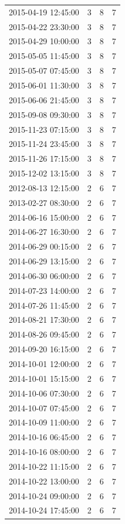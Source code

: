 \begin{tabular}{lrrr}
2015-04-19 12:45:00 & 3 & 8 & 7 \\
2015-04-22 23:30:00 & 3 & 8 & 7 \\
2015-04-29 10:00:00 & 3 & 8 & 7 \\
2015-05-05 11:45:00 & 3 & 8 & 7 \\
2015-05-07 07:45:00 & 3 & 8 & 7 \\
2015-06-01 11:30:00 & 3 & 8 & 7 \\
2015-06-06 21:45:00 & 3 & 8 & 7 \\
2015-09-08 09:30:00 & 3 & 8 & 7 \\
2015-11-23 07:15:00 & 3 & 8 & 7 \\
2015-11-24 23:45:00 & 3 & 8 & 7 \\
2015-11-26 17:15:00 & 3 & 8 & 7 \\
2015-12-02 13:15:00 & 3 & 8 & 7 \\
2012-08-13 12:15:00 & 2 & 6 & 7 \\
2013-02-27 08:30:00 & 2 & 6 & 7 \\
2014-06-16 15:00:00 & 2 & 6 & 7 \\
2014-06-27 16:30:00 & 2 & 6 & 7 \\
2014-06-29 00:15:00 & 2 & 6 & 7 \\
2014-06-29 13:15:00 & 2 & 6 & 7 \\
2014-06-30 06:00:00 & 2 & 6 & 7 \\
2014-07-23 14:00:00 & 2 & 6 & 7 \\
2014-07-26 11:45:00 & 2 & 6 & 7 \\
2014-08-21 17:30:00 & 2 & 6 & 7 \\
2014-08-26 09:45:00 & 2 & 6 & 7 \\
2014-09-20 16:15:00 & 2 & 6 & 7 \\
2014-10-01 12:00:00 & 2 & 6 & 7 \\
2014-10-01 15:15:00 & 2 & 6 & 7 \\
2014-10-06 07:30:00 & 2 & 6 & 7 \\
2014-10-07 07:45:00 & 2 & 6 & 7 \\
2014-10-09 11:00:00 & 2 & 6 & 7 \\
2014-10-16 06:45:00 & 2 & 6 & 7 \\
2014-10-16 08:00:00 & 2 & 6 & 7 \\
2014-10-22 11:15:00 & 2 & 6 & 7 \\
2014-10-22 13:00:00 & 2 & 6 & 7 \\
2014-10-24 09:00:00 & 2 & 6 & 7 \\
2014-10-24 17:45:00 & 2 & 6 & 7 \\

\end{tabular}
